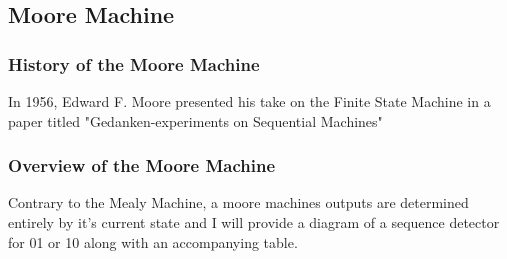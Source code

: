 \documentclass{article}
\begin{document}
\subsection{Moore Machine}
\subsubsection{History of the Moore Machine}
In 1956, Edward F. Moore presented his take on the Finite State Machine in a paper titled "Gedanken-experiments on Sequential Machines"
\subsubsection{Overview of the Moore Machine}
Contrary to the Mealy Machine, a moore machines outputs are determined entirely by it's current state and I will provide a diagram of a sequence detector for 01 or 10 along with an accompanying table. 
\end{document}
